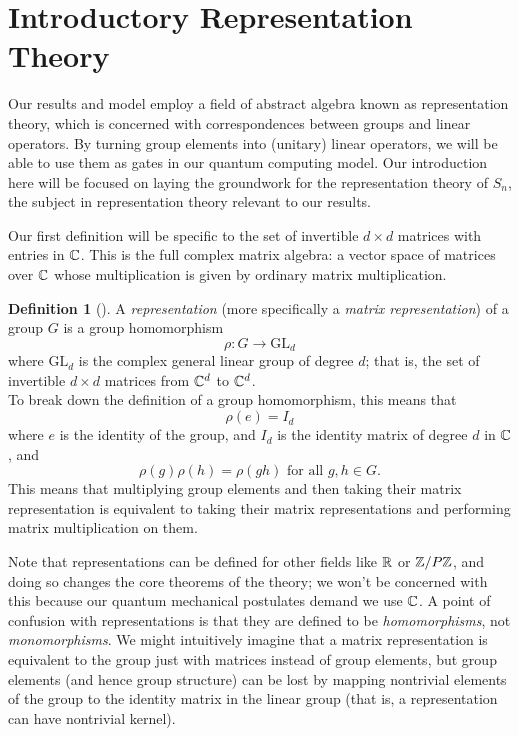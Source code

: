 \documentclass[12pt,twoside]{reedthesis}
\theoremstyle{plain}   %
\theoremstyle{definition}
\newtheorem{defn}{Definition}[section]
\theoremstyle{remark}
\numberwithin{equation}{section}
\def\GL{\mathrm{GL}} \def\SL{\mathrm{SL}}  \def\SP{\mathrm{SL}}\def\OG{\mathrm{O}}
\begin{document}
  \section{Introductory Representation Theory}
  Our results and model employ a field of abstract algebra known as representation theory, which is concerned with
  correspondences between groups and linear operators. By turning group elements into (unitary) linear operators, we will be able to use them as gates in our quantum computing model.
  Our introduction here will be focused on laying the groundwork for the representation theory of $S_n$, the subject in representation theory relevant to our results.
  \par
  Our first definition will be specific to the set of invertible $d \times d$ matrices with entries in $\mathbb{C}$.
  This is the full complex matrix algebra: a vector space of matrices over $\mathbb{C}$ whose multiplication is given by ordinary matrix multiplication.
  \begin{defn}[{\cite[Definition 1.2.1]{sagan}}]
    A \emph{representation} (more specifically a \emph{matrix representation}) of a group $G$ is a group homomorphism
    \[\rho: G \to \GL_d\]
    where $\GL_d$ is the complex general linear group of degree $d$; that is, the set of
    invertible $d \times d$ matrices from $\mathbb{C}^d$ to $\mathbb{C}^d$. \\
    To break down the definition of a group homomorphism, this means that
    \[ \rho(e) = I_d\]
    where $e$ is the identity of the group, and $I_d$ is the identity matrix of degree $d$ in $\mathbb{C}$, and
    \[\rho(g)\rho(h) = \rho(gh) \text{ for all $g,h \in G$.}\]
    This means that multiplying group elements and then taking their matrix representation is equivalent to
    taking their matrix representations and performing matrix multiplication on them.
  \end{defn}
  Note that representations can be defined for other fields like $\mathbb{R}$ or $\mathbb{Z}/P\mathbb{Z}$, and doing so changes the core theorems of the theory;
  we won't be concerned with this because our quantum mechanical postulates demand we use $\mathbb{C}$.
  A point of confusion with representations is that they are defined to be \emph{homomorphisms}, not \emph{monomorphisms}.
  We might intuitively imagine that a matrix representation is equivalent to the group just with matrices instead of group elements,
  but group elements (and hence group structure) can be lost by mapping nontrivial elements of the group to the identity matrix in the linear group
  (that is, a representation can have nontrivial kernel).
\end{document}
